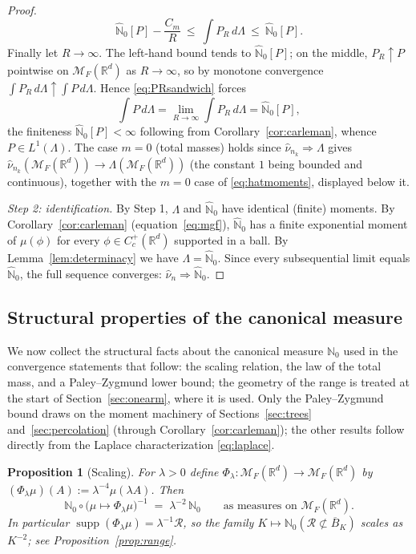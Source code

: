 \documentclass[11pt]{article}
\newtheorem{proposition}[theorem]{Proposition}
\theoremstyle{definition}
\theoremstyle{remark}
\newcommand{\R}{\mathbb{R}}
\newcommand{\bN}{{\mathbb{N}_0}}                 %
\newcommand{\cM}{{\mathcal{M}_F(\R^d)}}          %
\newcommand{\Cc}{C_c^+(\R^d)}
\newcommand{\supp}{\operatorname{supp}}
\newcommand{\Ran}{\mathcal{R}}                 %
\newcommand{\nuh}{\hat{\nu}}
\newcommand{\Nh}{\hat{\mathbb{N}}_0}
\numberwithin{equation}{section}
\theoremstyle{plain}
\theoremstyle{definition}
\theoremstyle{remark}
\theoremstyle{plain}
\begin{document}
\begin{proof}
\begin{equation}
\Nh[P]-\frac{C_m}{R}\ \le\ \int P_R\,d\Lambda\ \le\ \Nh[P].
\end{equation}
Finally let $R\to\infty$. The left-hand bound tends to $\Nh[P]$; on the
middle, $P_R\uparrow P$ pointwise on $\cM$ as $R\to\infty$, so by monotone
convergence $\int P_R\,d\Lambda\uparrow\int P\,d\Lambda$. Hence
\eqref{eq:PRsandwich} forces
\[
\int P\,d\Lambda=\lim_{R\to\infty}\int P_R\,d\Lambda=\Nh[P],
\]
the finiteness $\Nh[P]<\infty$ following from Corollary~\ref{cor:carleman},
whence $P\in L^1(\Lambda)$.
The case $m=0$ (total masses) holds since $\nuh_{n_k}\Rightarrow\Lambda$ gives
$\nuh_{n_k}(\cM)\to\Lambda(\cM)$ (the constant $1$ being bounded and
continuous), together with the $m=0$ case of \eqref{eq:hatmoments},
displayed below it.

\emph{Step 2: identification.}
By Step 1, $\Lambda$ and $\Nh$ have identical (finite) moments. By
Corollary~\ref{cor:carleman} (equation~\eqref{eq:mgf}), $\Nh$ has a finite
exponential moment of $\mu(\phi)$ for every $\phi\in\Cc$ supported in a ball.
By Lemma~\ref{lem:determinacy} we have $\Lambda=\Nh$. Since every
subsequential limit equals $\Nh$, the full sequence converges:
$\nuh_n\Rightarrow\Nh$.
\end{proof}

\subsection{Structural properties of the canonical measure}
\label{sec:sbmstructure}

We now collect the structural facts about the canonical measure $\bN$ used
in the convergence statements that follow: the scaling relation, the law of the
total mass, and a Paley--Zygmund lower bound; the geometry of the range is
treated at the start of Section~\ref{sec:onearm}, where it is used. Only the Paley--Zygmund bound draws on the moment machinery of
Sections~\ref{sec:trees} and~\ref{sec:percolation} (through
Corollary~\ref{cor:carleman}); the other results follow directly from the
Laplace characterization \eqref{eq:laplace}.

\begin{proposition}[Scaling]\label{prop:scaling}
For $\lambda>0$ define $\Phi_\lambda:\cM\to\cM$ by
$(\Phi_\lambda\mu)(A):=\lambda^{-4}\mu(\lambda A)$. Then
\[
\bN\circ\bigl(\mu\mapsto\Phi_\lambda\mu\bigr)^{-1}
\;=\;\lambda^{-2}\,\bN
\qquad\text{as measures on }\cM .
\]
In particular $\supp(\Phi_\lambda\mu)=\lambda^{-1}\Ran$, so  the family
$K\mapsto\bN(\Ran\not\subset\overline B_K)$ scales as $K^{-2}$; see
Proposition~\ref{prop:range}.
\end{proposition}
\end{document}
